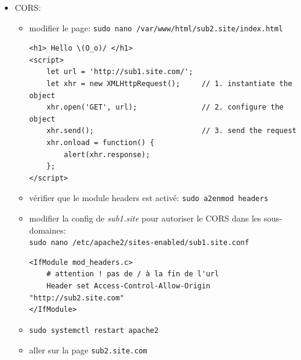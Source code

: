 \documentclass[a4paper]{article}
\begin{document}
\begin{itemize}
\item CORS:
\begin{example} \begin{itemize}
    \item modifier le page: \texttt{sudo nano /var/www/html/sub2.site/index.html}
\begin{example} \begin{verbatim}
<h1> Hello \(O_o)/ </h1>
<script>
    let url = 'http://sub1.site.com/';
    let xhr = new XMLHttpRequest();     // 1. instantiate the object
    xhr.open('GET', url);               // 2. configure the object
    xhr.send();                         // 3. send the request
    xhr.onload = function() {
        alert(xhr.response);
    };
</script>
\end{verbatim} \end{example}
    \item vérifier que le module headers est activé: \texttt{sudo a2enmod headers}
    \item modifier la config de \textit{sub1.site} pour autoriser le CORS dans les sous-domaines: \\
    \texttt{sudo nano /etc/apache2/sites-enabled/sub1.site.conf}
\begin{example} \begin{verbatim}
<IfModule mod_headers.c>
    # attention ! pas de / à la fin de l'url
    Header set Access-Control-Allow-Origin "http://sub2.site.com"
</IfModule>
\end{verbatim} \end{example}
    \item \texttt{sudo systemctl restart apache2}
    \item aller sur la page \texttt{sub2.site.com}
\end{itemize} \end{example}



\end{itemize}
\end{document}
